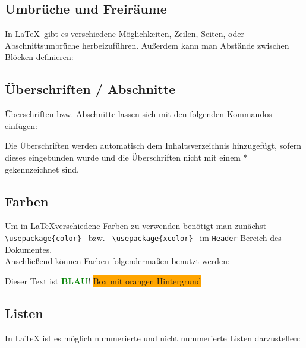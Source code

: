\subsection{Umbrüche und Freiräume}
In \LaTeX \ gibt es verschiedene Möglichkeiten, Zeilen, Seiten, oder 
Abschnittsumbrüche herbeizuführen. Außerdem kann man Abstände zwischen Blöcken 
definieren:


\subsection{Überschriften / Abschnitte}
Überschriften bzw. Abschnitte lassen sich mit den folgenden Kommandos einfügen:

Die Überschriften werden automatisch dem Inhaltsverzeichnis hinzugefügt, sofern 
dieses eingebunden wurde und die Überschriften nicht mit einem $*$ 
gekennzeichnet sind.
\subsection{Farben}

Um in \LaTeX verschiedene Farben zu verwenden benötigt man zunächst
\lstinline$ \usepackage{color} $ bzw. \lstinline$ \usepackage{xcolor} $ im 
\texttt{Header}-Bereich des Dokumentes.
\\
Anschließend können Farben folgendermaßen benutzt werden:
\begin{flushleft}
\pagecolor{white}   %
\color{blue}         %
Dieser Text ist
\textcolor{green}{\textbf{BLAU}}!    %
\colorbox{orange}{Box mit orangen Hintergrund}   %
\color{schrift}
\\
\end{flushleft}



\subsection{Listen}
In LaTeX ist es möglich nummerierte und nicht nummerierte Listen darzustellen:
